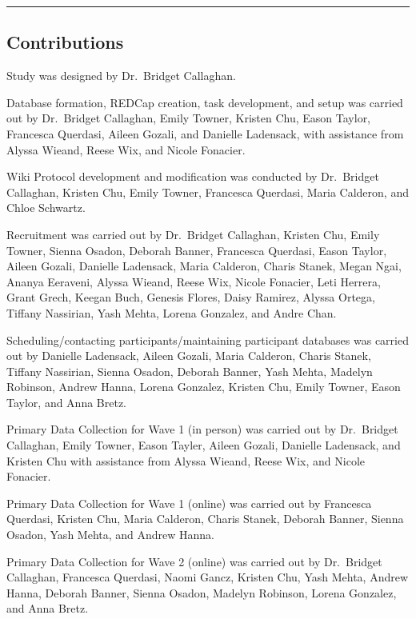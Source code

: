 \documentclass[
]{book}
\begin{document}
\begin{center}\rule{0.5\linewidth}{0.5pt}\end{center}

\hypertarget{contributions}{%
\subsection{Contributions}\label{contributions}}

Study was designed by Dr.~Bridget Callaghan.

Database formation, REDCap creation, task development, and setup was carried out by Dr.~Bridget Callaghan, Emily Towner, Kristen Chu, Eason Taylor, Francesca Querdasi, Aileen Gozali, and Danielle Ladensack, with assistance from Alyssa Wieand, Reese Wix, and Nicole Fonacier.

Wiki Protocol development and modification was conducted by Dr.~Bridget Callaghan, Kristen Chu, Emily Towner, Francesca Querdasi, Maria Calderon, and Chloe Schwartz.

Recruitment was carried out by Dr.~Bridget Callaghan, Kristen Chu, Emily Towner, Sienna Osadon, Deborah Banner, Francesca Querdasi, Eason Taylor, Aileen Gozali, Danielle Ladensack, Maria Calderon, Charis Stanek, Megan Ngai, Ananya Eeraveni, Alyssa Wieand, Reese Wix, Nicole Fonacier, Leti Herrera, Grant Grech, Keegan Buch, Genesis Flores, Daisy Ramirez, Alyssa Ortega, Tiffany Nassirian, Yash Mehta, Lorena Gonzalez, and Andre Chan.

Scheduling/contacting participants/maintaining participant databases was carried out by Danielle Ladensack, Aileen Gozali, Maria Calderon, Charis Stanek, Tiffany Nassirian, Sienna Osadon, Deborah Banner, Yash Mehta, Madelyn Robinson, Andrew Hanna, Lorena Gonzalez, Kristen Chu, Emily Towner, Eason Taylor, and Anna Bretz.

Primary Data Collection for Wave 1 (in person) was carried out by Dr.~Bridget Callaghan, Emily Towner, Eason Tayler, Aileen Gozali, Danielle Ladensack, and Kristen Chu with assistance from Alyssa Wieand, Reese Wix, and Nicole Fonacier.

Primary Data Collection for Wave 1 (online) was carried out by Francesca Querdasi, Kristen Chu, Maria Calderon, Charis Stanek, Deborah Banner, Sienna Osadon, Yash Mehta, and Andrew Hanna.

Primary Data Collection for Wave 2 (online) was carried out by Dr.~Bridget Callaghan, Francesca Querdasi, Naomi Gancz, Kristen Chu, Yash Mehta, Andrew Hanna, Deborah Banner, Sienna Osadon, Madelyn Robinson, Lorena Gonzalez, and Anna Bretz.
\end{document}
